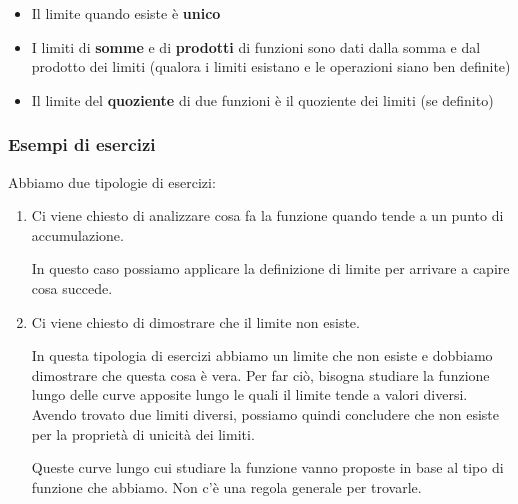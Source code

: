 \begin{itemize}
    \item Il limite quando esiste è \textbf{unico}
    \item I limiti di \textbf{somme} e di \textbf{prodotti} di funzioni sono dati dalla somma e dal prodotto dei limiti (qualora i limiti esistano e le operazioni siano ben definite)
    \item Il limite del \textbf{quoziente} di due funzioni è il quoziente dei limiti (se definito)
\end{itemize}


\pagebreak

\subsubsection{Esempi di esercizi}

Abbiamo due tipologie di esercizi:

\begin{enumerate}
    \item Ci viene chiesto di analizzare cosa fa la funzione quando tende a un punto di accumulazione.

          In questo caso possiamo applicare la definizione di limite per arrivare a capire cosa succede.
    \item Ci viene chiesto di dimostrare che il limite non esiste.

          In questa tipologia di esercizi abbiamo un limite che non esiste e dobbiamo dimostrare che questa cosa è vera. Per far ciò, bisogna studiare la funzione lungo delle curve apposite lungo le quali il limite tende a valori diversi. Avendo trovato due limiti diversi, possiamo quindi concludere che non esiste per la proprietà di unicità dei limiti.

          Queste curve lungo cui studiare la funzione vanno proposte in base al tipo di funzione che abbiamo. Non c'è una regola generale per trovarle.
\end{enumerate}

